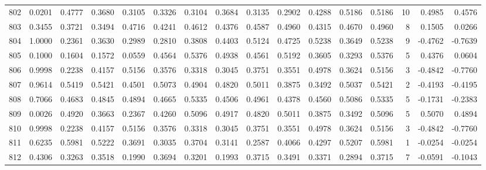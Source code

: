 \begin{tabular}{lrrrrrrrrrrrrrrr}
802 &      0.0201 &  0.4777 &  0.3680 &  0.3105 &  0.3326 &  0.3104 &  0.3684 &  0.3135 &  0.2902 &  0.4288 &   0.5186 &     0.5186 &     10 &                    0.4985 &                     0.4576 \\
803 &      0.3455 &  0.3721 &  0.3494 &  0.4716 &  0.4241 &  0.4612 &  0.4376 &  0.4587 &  0.4960 &  0.4315 &   0.4670 &     0.4960 &      8 &                    0.1505 &                     0.0266 \\
804 &      1.0000 &  0.2361 &  0.3630 &  0.2989 &  0.2810 &  0.3808 &  0.4403 &  0.5124 &  0.4725 &  0.5238 &   0.3649 &     0.5238 &      9 &                   -0.4762 &                    -0.7639 \\
805 &      0.1000 &  0.1604 &  0.1572 &  0.0559 &  0.4564 &  0.5376 &  0.4938 &  0.4561 &  0.5192 &  0.3605 &   0.3293 &     0.5376 &      5 &                    0.4376 &                     0.0604 \\
806 &      0.9998 &  0.2238 &  0.4157 &  0.5156 &  0.3576 &  0.3318 &  0.3045 &  0.3751 &  0.3551 &  0.4978 &   0.3624 &     0.5156 &      3 &                   -0.4842 &                    -0.7760 \\
807 &      0.9614 &  0.5419 &  0.5421 &  0.4501 &  0.5073 &  0.4904 &  0.4820 &  0.5011 &  0.3875 &  0.3492 &   0.5037 &     0.5421 &      2 &                   -0.4193 &                    -0.4195 \\
808 &      0.7066 &  0.4683 &  0.4845 &  0.4894 &  0.4665 &  0.5335 &  0.4506 &  0.4961 &  0.4378 &  0.4560 &   0.5086 &     0.5335 &      5 &                   -0.1731 &                    -0.2383 \\
809 &      0.0026 &  0.4920 &  0.3663 &  0.2367 &  0.4260 &  0.5096 &  0.4917 &  0.4820 &  0.5011 &  0.3875 &   0.3492 &     0.5096 &      5 &                    0.5070 &                     0.4894 \\
810 &      0.9998 &  0.2238 &  0.4157 &  0.5156 &  0.3576 &  0.3318 &  0.3045 &  0.3751 &  0.3551 &  0.4978 &   0.3624 &     0.5156 &      3 &                   -0.4842 &                    -0.7760 \\
811 &      0.6235 &  0.5981 &  0.5222 &  0.3691 &  0.3035 &  0.3704 &  0.3141 &  0.2587 &  0.4066 &  0.4297 &   0.5207 &     0.5981 &      1 &                   -0.0254 &                    -0.0254 \\
812 &      0.4306 &  0.3263 &  0.3518 &  0.1990 &  0.3694 &  0.3201 &  0.1993 &  0.3715 &  0.3491 &  0.3371 &   0.2894 &     0.3715 &      7 &                   -0.0591 &                    -0.1043 \\

\end{tabular}
